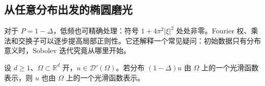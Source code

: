 \subsection{从任意分布出发的椭圆磨光}
\label{b2:subsec:G-constant-elliptic}

对于 \(P=1-\Delta\)，低频也可精确处理：符号 \(1+4\pi^2|\xi|^2\) 处处非零。Fourier 权、乘法和交换子可以逐步提高局部正则性。它还解释一个常见疑问：初始数据只有分布意义时，Sobolev 迭代究竟从哪里开始。

\begin{proposition}[常系数椭圆磨光的直接证明]
\label{b2:prop:G-constant-elliptic}
设 \(d\ge1\)、\(\Omega\subset\mathbb R^d\) 开，\(u\in\mathcal D'(\Omega)\)。若分布 \((1-\Delta)u\) 由 \(\Omega\) 上的一个光滑函数表示，则 \(u\) 也由 \(\Omega\) 上的一个光滑函数表示。
\end{proposition}
